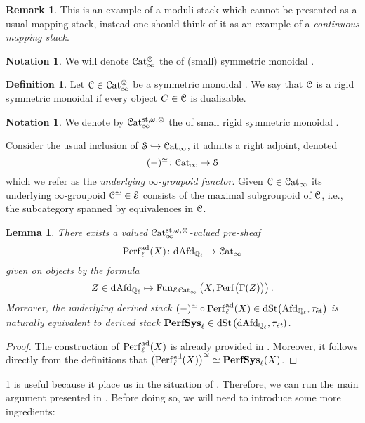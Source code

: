\documentclass[10pt,a4paper]{amsart}
\numberwithin{equation}{subsection}
\theoremstyle{plain}
\newtheorem{lemma}[theorem]{Lemma}
\theoremstyle{definition}
\newtheorem{defi}[theorem]{Definition}
\newtheorem{notation}[theorem]{Notation}
\newtheorem{rema}[theorem]{Remark}
\theoremstyle{remark}
\numberwithin{equation}{section}
\begin{document}
\begin{rema}
This is an example of a moduli stack which cannot be presented as a usual mapping stack, instead one should think of it as an example of a \emph{continuous
mapping stack}.
\end{rema}

\begin{notation}
We will denote $\mathcal{C}\mathrm{at}_\infty^{\otimes}$ the \infcat of (small) symmetric monoidal \infcats.
\end{notation}

\begin{defi}
Let $\mathcal C \in \mathcal{C}\mathrm{at}_\infty^\otimes$ be a symmetric monoidal \infcat. We say that $\mathcal C$ is a rigid symmetric monoidal \infcat if every object $C \in \mathcal C$ is dualizable.
\end{defi}

\begin{notation} \label{rigCat}
We denote by $\mathcal{C}\mathrm{at}^{\mathrm{st}, \omega, \otimes}_{\infty}$ the \infcat of small rigid symmetric monoidal \infcats.
\end{notation}

 Consider the usual inclusion of \infcats $\mathcal S \hookrightarrow \mathcal{C}\mathrm{at}_\infty$, it admits a right adjoint, denoted
 	\[
		(-)^{\simeq} \colon \mathcal{C}\mathrm{at}_\infty \to \mathcal S
	\]
which we refer as the \emph{underlying $\infty$-groupoid functor}. Given $\mathcal C \in \mathcal{C}\mathrm{at}_\infty$ its underlying $\infty$-groupoid $\mathcal C^{\simeq} \in \mathcal S$ consists of the maximal subgroupoid of $\mathcal C$, 
i.e., the subcategory spanned by equivalences in $\mathcal C$.

\begin{lemma} \label{lem:rigidity}
There exists a valued $\mathcal{C}\mathrm{at}_\infty^{\mathrm{st}, \omega, \otimes}$-valued pre-sheaf 
	\[
		\mathrm{Perf}^{\mathrm{ad}}_\ell(X) \colon \mathrm{dAfd}_{\mathbb{Q}_\ell} \to \mathcal{C}\mathrm{at}_\infty
	\]
given on objects by the formula
	\[
		Z \in \mathrm{dAfd}_{\mathbb{Q}_\ell} \mapsto \mathrm{Fun}_{\mathcal E \mathcal{C}\mathrm{at}_\infty} \left( X, \mathrm{Perf} \big( \Gamma(Z) \big) \right).	
	\]
Moreover, the underlying derived stack $(-)^{\simeq} \circ \mathrm{Perf}^{\mathrm{ad}}_\ell(X) \in \mathrm{dSt} \big( \mathrm{Afd}_{\mathbb{Q}_\ell}, \tau_{\text{\'et}} \big)$ is naturally
equivalent to derived stack $\mathbf{PerfSys}_{\ell} \in \mathrm{dSt} \left( \mathrm{dAfd}_{\mathbb{Q}_\ell}, \tau_{\emph{\text{\'et}}}\right)$.
\end{lemma}

\begin{proof}
The construction of $\mathrm{Perf}^{\mathrm{ad}}_\ell(X)$ is already provided in \cite[Definition 4.3.11]{me1}. Moreover, it follows directly from the definitions that $ \big( \mathrm{Perf}^{\mathrm{ad}}_\ell(X) \big)^\simeq \simeq \mathbf{PerfSys}_{\ell}(X)$.
\end{proof}

\cref{lem:rigidity} is useful because it place us in the situation of \cite[\S 3]{toen_ss}. Therefore, we can run the main argument presented in \cite[\S 3]{toen_ss}. Before doing so, we will need to introduce some more ingredients:
\end{document}

